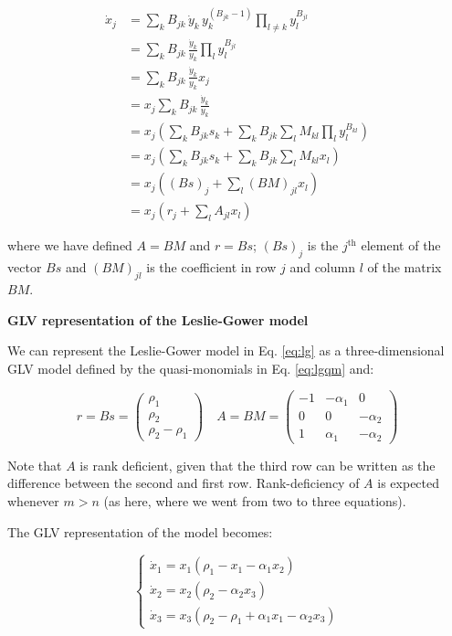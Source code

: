 \documentclass{article}
\begin{document}
\begin{equation}
\label{eq:quasimonodt}
\begin{aligned}
\dot{x}_j &= \sum_k B_{jk}\, \dot{y}_k \, y_{k}^{(B_{jk} -1)} \prod_{l \neq k} y_{l}^{B_{jl}}\\
&=\sum_k B_{jk}\, \frac{\dot{y}_k}{y_k} \prod_{l} y_{l}^{B_{jl}}\\
&=\sum_k B_{jk}\, \frac{\dot{y}_k}{y_k} x_j\\
&=x_j \sum_k B_{jk}\, \frac{\dot{y}_k}{y_k} \\
&=x_j \left(\sum_k B_{jk} s_k + \sum_k B_{jk} \sum_l M_{kl} \prod_l y_l^{B_{kl}} \right)\\
&=x_j \left(\sum_k B_{jk} s_k + \sum_k B_{jk} \sum_l M_{kl} x_l \right)\\
&=x_j \left((B s)_j + \sum_l (B M)_{jl} x_l \right)\\
&=x_j \left(r_j + \sum_l A_{jl} x_l \right)
\end{aligned}
\end{equation}

where we have defined \(A = BM\) and \(r = B s\); \((Bs)_j\) is the
\(j^{\text{th}}\) element of the vector \(Bs\) and \((B M)_{jl}\) is the
coefficient in row \(j\) and column \(l\) of the matrix \(BM\).

\begin{cb}
\textbf{GLV representation of the Leslie-Gower model}

We can represent the Leslie-Gower model in Eq. \ref{eq:lg} as a three-dimensional GLV model defined by the quasi-monomials in Eq. \ref{eq:lgqm} and:

\begin{equation}
r = B s = \begin{pmatrix}
\rho_1\\
\rho_2\\
\rho_2 - \rho_1
\end{pmatrix}
\quad
A = B M = \begin{pmatrix}
-1 & -\alpha_1 & 0\\
0 & 0 & -\alpha_2\\
1 & \alpha_1 & -\alpha_2
\end{pmatrix}
\end{equation}

Note that $A$ is rank deficient, given that the third row can be written as the difference between the second and first row. Rank-deficiency of $A$ is expected whenever $m > n$ (as here, where we went from two to three equations).

The GLV representation of the model becomes:

\begin{equation}
\label{eq:lgglv}
\begin{cases}
\dot{x}_1 = x_1 (\rho_1 - x_1 - \alpha_1 x_2)\\
\dot{x}_2 = x_2 (\rho_2 - \alpha_2 x_3)\\
\dot{x}_3 = x_3 (\rho_2 - \rho_1 + \alpha_1 x_1 - \alpha_2 x_3)
\end{cases}
\end{equation}

\end{cb}
\end{document}
